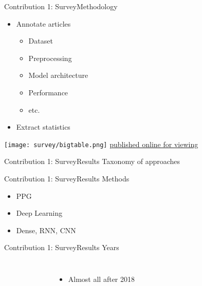 \begin{frame}{Contribution 1: Survey}{Methodology}
    \begin{itemize}
        \item Annotate articles
              \begin{itemize}
                  \item Dataset
                  \item Preprocessing
                  \item Model architecture
                  \item Performance
                  \item etc.
              \end{itemize}
        \item Extract statistics
    \end{itemize}
    \texttt{[image: survey/bigtable.png]}
    \href{https://docs.google.com/spreadsheets/u/1/d/e/2PACX-1vR-3MoAcaD-N30ZM15ozSlxh8RHTUBv2KETb9f2g852htlH-5PNt_S8khVnUFLWeEo2H91ZW9hCEi8o/pubhtml}{published online for viewing}
\end{frame}

\begin{frame}{Contribution 1: Survey}{Results}
    Taxonomy of approaches
    \begin{figure}
        
    \end{figure}
\end{frame}

\begin{frame}{Contribution 1: Survey}{Results}
    Methods
    \begin{figure}
        
        \hfill
        
        \hfill
        
    \end{figure}
    \begin{itemize}
        \item PPG
        \item Deep Learning
        \item Dense, RNN, CNN
    \end{itemize}
\end{frame}

\begin{frame}{Contribution 1: Survey}{Results}
    Years
    \begin{columns}
        \begin{figure}
            
        \end{figure}

        \begin{itemize}
            \item Almost all after 2018
        \end{itemize}
    \end{columns}


\end{frame}


